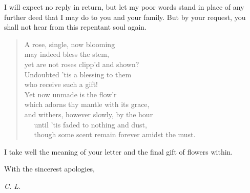 \documentclass[12pt,letterpaper,oneside]{memoir}
\begin{document}
  I will expect no reply in return, but let my poor words stand in place
  of any further deed that I may do to you and your family. But by your
  request, you shall not hear from this repentant soul again.

  \begin{quote}
  A rose, single, now blooming\\
  \hspace*{0.333em}\hspace*{0.333em} may indeed bless the stem,\\
  yet are not roses clipp'd and shown?\\
  \hspace*{0.333em}\hspace*{0.333em} Undoubted 'tis a blessing to them\\
  who receive such a gift!\\
  \hspace*{0.333em}\hspace*{0.333em} Yet now unmade is the flow'r\\
  which adorns thy mantle with its grace,\\
  \hspace*{0.333em}\hspace*{0.333em} and withers, however slowly, by the
  hour\\
  \hspace*{0.333em}\hspace*{0.333em} ~~ until 'tis faded to nothing and
  dust,\\
  \hspace*{0.333em}\hspace*{0.333em} ~~ though some scent remain forever
  amidst the must.
  \end{quote}

  I take well the meaning of your letter and the final gift of flowers
  within.

  With the sincerest apologies,

  \emph{C. L.}
\end{document}
